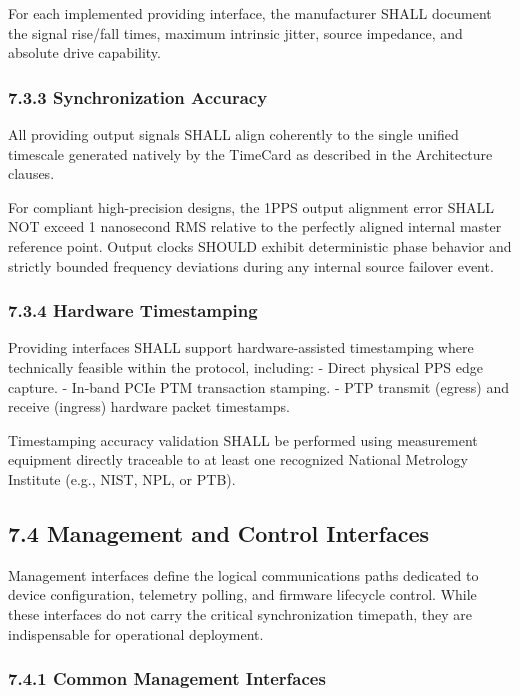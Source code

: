\documentclass[
]{article}
\begin{document}
For each implemented providing interface, the manufacturer SHALL
document the signal rise/fall times, maximum intrinsic jitter, source
impedance, and absolute drive capability.

\subsubsection{7.3.3 Synchronization
Accuracy}\label{synchronization-accuracy}

All providing output signals SHALL align coherently to the single
unified timescale generated natively by the TimeCard as described in the
Architecture clauses.

For compliant high-precision designs, the 1PPS output alignment error
SHALL NOT exceed 1 nanosecond RMS relative to the perfectly aligned
internal master reference point. Output clocks SHOULD exhibit
deterministic phase behavior and strictly bounded frequency deviations
during any internal source failover event.

\subsubsection{7.3.4 Hardware
Timestamping}\label{hardware-timestamping-1}

Providing interfaces SHALL support hardware-assisted timestamping where
technically feasible within the protocol, including: - Direct physical
PPS edge capture. - In-band PCIe PTM transaction stamping. - PTP
transmit (egress) and receive (ingress) hardware packet timestamps.

Timestamping accuracy validation SHALL be performed using measurement
equipment directly traceable to at least one recognized National
Metrology Institute (e.g., NIST, NPL, or PTB).

\subsection{7.4 Management and Control
Interfaces}\label{management-and-control-interfaces}

Management interfaces define the logical communications paths dedicated
to device configuration, telemetry polling, and firmware lifecycle
control. While these interfaces do not carry the critical
synchronization timepath, they are indispensable for operational
deployment.

\subsubsection{7.4.1 Common Management
Interfaces}\label{common-management-interfaces}
\end{document}
